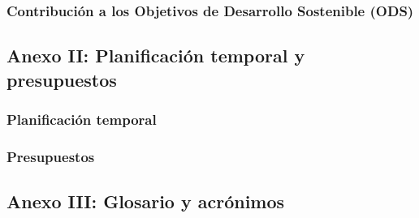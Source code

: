\documentclass[a4paper, 12pt, spanish, twoside]{article}
\begin{document}
\subsubsection{Contribución a los Objetivos de Desarrollo Sostenible (ODS)} \label{sec:ods}

\clearpage




\newpage
\subsection{Anexo II: Planificación temporal y presupuestos} \label{sec:anexo2}
\subsubsection{Planificación temporal} \label{sec:anexo2:temporal}
\subsubsection{Presupuestos} \label{sec:anexo2:presupuestos}

\clearpage




\newpage
\subsection{Anexo III: Glosario y acrónimos} \label{sec:anexo3}

\glsaddall


\printglossary[title=Glosario, toctitle=Glosario]

\printglossary[type=\acronymtype, title=Acrónimos, toctitle=Acrónimos]
\end{document}
